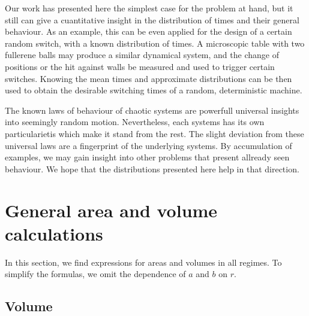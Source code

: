 \documentclass[superscriptaddress,pre,reprint,showpacs,twocolumn]{revtex4-1}
\begin{document}
Our work has presented here the simplest case for the problem at hand, but it still
can give a cuantitative insight in the distribution of times and their
general behaviour. As an example, this can be even applied for the design of a certain
random switch, with a known distribution of times. A microscopic table with two
fullerene balls may produce a similar dynamical system, and the change of positions
or the hit against walls be measured and used to trigger certain switches. 
Knowing the mean times and approximate distributions can be then used
to obtain the desirable switching times of a random, deterministic machine.

The known laws of behaviour of chaotic systems are powerfull universal insights
into seemingly random motion. Nevertheless, each systems has its own
particularietis which make it stand from the rest. The slight deviation from
these universal laws are a fingerprint of the underlying systems. By
accumulation of examples, we may gain insight into other problems that
present allready seen behaviour. We hope that the distributions presented here
help in that direction. 





\appendix
\section{General area and volume calculations}
\label{app:area_volume}

In this section, we find expressions for areas and volumes in all 
regimes.
To simplify the formulas, we omit the dependence
of $a$ and $b$ on $r$.



\subsection{Volume}\label{app:volume}
\end{document}
